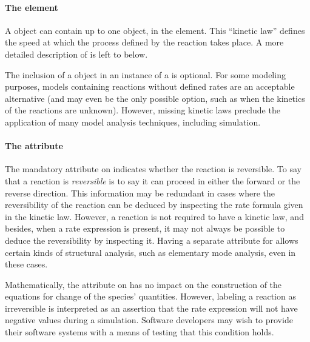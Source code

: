 \paragraph{The  element}

A \Reaction object can contain up to one \KineticLaw object, in
the  element.  This ``kinetic law'' defines the
speed at which the process defined by the reaction takes place.  A
more detailed description of \KineticLaw is left to
 below.

The inclusion of a \KineticLaw object in an instance of a
\Reaction is optional.  For some modeling purposes, models
containing reactions without defined rates are an acceptable
alternative (and may even be the only possible option, such as
when the kinetics of the reactions are unknown).  However, missing
kinetic laws preclude the application of many model analysis
techniques, including simulation.  


\paragraph{The  attribute}
\label{sec:reversible}

The mandatory  attribute  on \Reaction
indicates whether the reaction is reversible.  To say that a
reaction is \emph{reversible} is to say it can proceed in either
the forward or the reverse direction.  This information may be
redundant in cases where the reversibility of the reaction can be
deduced by inspecting the rate formula given in the kinetic law.
However, a reaction is not required to have a kinetic law, and
besides, when a rate expression is present, it may not always be
possible to deduce the reversibility by inspecting it.  Having a
separate attribute for  allows certain kinds of
structural analysis, such as elementary mode analysis, even in
these cases.

Mathematically, the  attribute on \Reaction has
no impact on the construction of the equations for change of the
species' quantities.  However, labeling a reaction as irreversible
is interpreted as an assertion that the rate expression will not
have negative values during a simulation.  Software developers may
wish to provide their software systems with a means of testing
that this condition holds.

